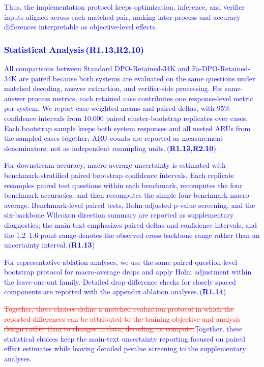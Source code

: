 \documentclass[a4paper,fleqn,doubleblind]{cas-sc}
\DeclareRobustCommand{\deleted}[1]{\textcolor{red}{\sout{#1}}}
\DeclareRobustCommand{\added}[1]{\textcolor{blue}{#1}}
\DeclareRobustCommand{\revtag}[1]{\textcolor{blue}{\scriptsize\,(\textbf{#1})}}
\begin{document}
\added{Thus, the implementation protocol keeps optimization, inference, and verifier inputs aligned across each matched pair, making later process and accuracy differences interpretable as objective-level effects.}

\subsubsection{\added{Statistical Analysis}\revtag{R1.13,R2.10}}
\added{All comparisons between Standard DPO-Retained-34K and Fa-DPO-Retained-34K are paired because both systems are evaluated on the same questions under matched decoding, answer extraction, and verifier-side processing. For same-answer process metrics, each retained case contributes one response-level metric per system. We report case-weighted means and paired deltas, with 95\% confidence intervals from 10,000 paired cluster-bootstrap replicates over cases. Each bootstrap sample keeps both system responses and all nested ARUs from the sampled cases together; ARU counts are reported as measurement denominators, not as independent resampling units.}\revtag{R1.13,R2.10}

\added{For downstream accuracy, macro-average uncertainty is estimated with benchmark-stratified paired bootstrap confidence intervals. Each replicate resamples paired test questions within each benchmark, recomputes the four benchmark accuracies, and then recomputes the simple four-benchmark macro-average. Benchmark-level paired tests, Holm-adjusted p-value screening, and the six-backbone Wilcoxon direction summary are reported as supplementary diagnostics; the main text emphasizes paired deltas and confidence intervals, and the 1.2--1.6 point range denotes the observed cross-backbone range rather than an uncertainty interval.}\revtag{R1.13}

\added{For representative ablation analyses, we use the same paired question-level bootstrap protocol for macro-average drops and apply Holm adjustment within the leave-one-out family. Detailed drop-difference checks for closely spaced components are reported with the appendix ablation analyses.}\revtag{R1.14}

\deleted{Together, these choices define a matched evaluation protocol in which the reported differences can be attributed to the training objective and analysis design rather than to changes in data, decoding, or compute.}\added{Together, these statistical choices keep the main-text uncertainty reporting focused on paired effect estimates while leaving detailed p-value screening to the supplementary analyses.}
\end{document}
